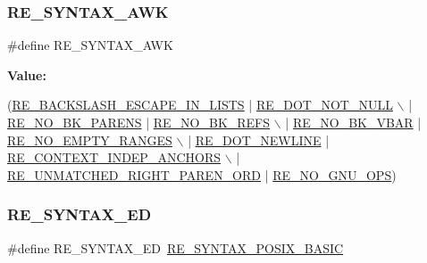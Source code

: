 \subsubsection{\texorpdfstring{R\+E\+\_\+\+S\+Y\+N\+T\+A\+X\+\_\+\+A\+WK}{RE\_SYNTAX\_AWK}}
{\footnotesize\ttfamily \#define R\+E\+\_\+\+S\+Y\+N\+T\+A\+X\+\_\+\+A\+WK}

{\bfseries Value\+:}
\begin{DoxyCode}
(\hyperlink{a00092_a45356e84c34c98ed125ea5f75814ccc5}{RE\_BACKSLASH\_ESCAPE\_IN\_LISTS}   | \hyperlink{a00092_a30d6a2fb42df1a210e830f3cd3f06977}{RE\_DOT\_NOT\_NULL}            \(\backslash\)
   | \hyperlink{a00092_af2f17f18a9c771c91d963f466f559e68}{RE\_NO\_BK\_PARENS}              | \hyperlink{a00092_aed01be95fde1250190b37b7788af5f35}{RE\_NO\_BK\_REFS}           \(\backslash\)
   | \hyperlink{a00092_a834997e69569c41f0394d6ee120051a0}{RE\_NO\_BK\_VBAR}                | \hyperlink{a00092_ae01c1dfed60f209c2f10f252c3acf9fd}{RE\_NO\_EMPTY\_RANGES}           \(\backslash\)
   | \hyperlink{a00092_a405fe43871f2df60407b3c8272f4624c}{RE\_DOT\_NEWLINE}         | \hyperlink{a00092_a544bf7770a00eaaa62374a00fea08a2d}{RE\_CONTEXT\_INDEP\_ANCHORS}        \(\backslash\)
   | \hyperlink{a00092_af1907a994cab6bd73ad14677b126a64b}{RE\_UNMATCHED\_RIGHT\_PAREN\_ORD} | \hyperlink{a00092_af60fbd1f693bfb95fd0a80caae9aa4c5}{RE\_NO\_GNU\_OPS})
\end{DoxyCode}
\mbox{\label{a00092_ab994c38eb1c30506bef10bbbaee88901}} 
\subsubsection{\texorpdfstring{R\+E\+\_\+\+S\+Y\+N\+T\+A\+X\+\_\+\+ED}{RE\_SYNTAX\_ED}}
{\footnotesize\ttfamily \#define R\+E\+\_\+\+S\+Y\+N\+T\+A\+X\+\_\+\+ED~\hyperlink{a00092_af0f03965e6d6bdc7576fe863c81bb7af}{R\+E\+\_\+\+S\+Y\+N\+T\+A\+X\+\_\+\+P\+O\+S\+I\+X\+\_\+\+B\+A\+S\+IC}}

\mbox{\label{a00092_a19229061580484f7e9c58872061e8986}} 
